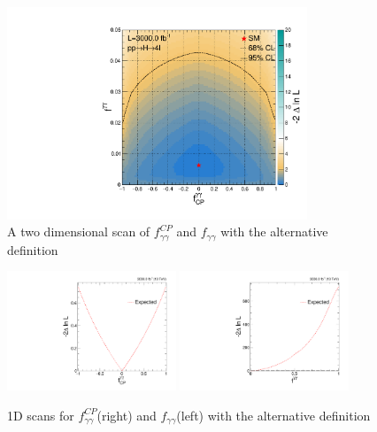 \documentclass[10pt,a4paper]{article}
\begin{document}
\begin{figure}[t]
\centering
\includegraphics[width=0.8\textwidth]{./2D/2D_fgg_fggcp.pdf}
\caption{A two dimensional scan of  $f_{\gamma\gamma}^{CP}$ and $f_{\gamma\gamma}$ with the alternative definition}
\label{fig:2D}
\end{figure}



\begin{figure}[t]
\centering
\includegraphics[width=0.45\textwidth]{./output_alt_fggcp.pdf}
\includegraphics[width=0.45\textwidth]{./output_alt_fgg.pdf}
\caption{1D scans for $f_{\gamma\gamma}^{CP}$(right) and $f_{\gamma\gamma}$(left) with the alternative definition}
\label{fig:_fgg_fggcp}
\end{figure}
\end{document}
